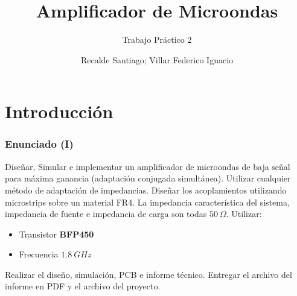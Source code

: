 \documentclass[9pt]{beamer}
\begin{document}
	\author{Recalde Santiago; Villar Federico Ignacio}
	\title{Amplificador de Microondas}
	\subtitle{Trabajo Práctico 2}
	\subject{Electrónica Analógica III}
	
	\def\Dimline[#1][#2][#3]{
		\draw[ %
		decoration={markings, %
			mark=at position 0 with {\arrowreversed[scale=0.5]{dimarrow}};,
			mark=at position .5 with {\node[black] at (0,0.25) {#3};},
			mark=at position 1 with {\arrow[scale=0.5]{dimarrow}};,
		},
		postaction=decorate] #1 -- #2 ;
	}
	
	
	\begin{frame}[plain]
		\maketitle
	\end{frame}
	
	\section{Introducción}
	\begin{frame}
		\frametitle{Enunciado (I)}
		
		Diseñar, Simular e implementar un amplificador de microondas de baja señal para máxima ganancia (adaptación conjugada simultánea). Utilizar cualquier método de adaptación de impedancias. Diseñar los acoplamientos utilizando microstrips sobre un material FR4. La impedancia característica del sistema, impedancia de fuente e impedancia de carga son todas $50 \ \Omega$. Utilizar:
		\begin{itemize}
			\item Transistor \textbf{BFP450}
			\item Frecuencia $1.8 \ GHz$
		\end{itemize}
		Realizar el diseño, simulación, PCB e informe técnico. Entregar el archivo del informe en PDF y el archivo del proyecto.
	\end{frame}
	
\end{document}
